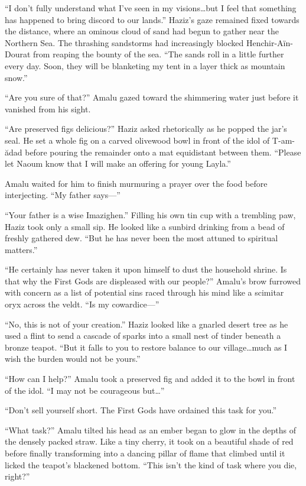 ``I don't fully understand what I've seen in my visions\ldots{}but I feel that something has happened to bring discord to our lands.'' Haziz's gaze remained fixed towards the distance, where an ominous cloud of sand had begun to gather near the Northern Sea. The thrashing sandstorms had increasingly blocked Henchir-Aïn-Dourat from reaping the bounty of the sea. ``The sands roll in a little further every day. Soon, they will be blanketing my tent in a layer thick as mountain snow.''

``Are you sure of that?'' Amalu gazed toward the shimmering water just before it vanished from his sight.

``Are preserved figs delicious?'' Haziz asked rhetorically as he popped the jar's seal. He set a whole fig on a carved olivewood bowl in front of the idol of T-am-ădad before pouring the remainder onto a mat equidistant between them. ``Please let Naoum know that I will make an offering for young Layla.''

Amalu waited for him to finish murmuring a prayer over the food before interjecting. ``My father says---''

``Your father is a wise Imazighen.'' Filling his own tin cup with a trembling paw, Haziz took only a small sip. He looked like a sunbird drinking from a bead of freshly gathered dew. ``But he has never been the most attuned to spiritual matters.''

``He certainly has never taken it upon himself to dust the household shrine. Is that why the First Gods are displeased with our people?'' Amalu's brow furrowed with concern as a list of potential sins raced through his mind like a scimitar oryx across the veldt. ``Is my cowardice---''

``No, this is not of your creation.'' Haziz looked like a gnarled desert tree as he used a flint to send a cascade of sparks into a small nest of tinder beneath a bronze teapot. ``But it falls to you to restore balance to our village\ldots{}much as I wish the burden would not be yours.''

``How can I help?'' Amalu took a preserved fig and added it to the bowl in front of the idol. ``I may not be courageous but\ldots''

``Don't sell yourself short. The First Gods have ordained this task for you.''

``What task?'' Amalu tilted his head as an ember began to glow in the depths of the densely packed straw. Like a tiny cherry, it took on a beautiful shade of red before finally transforming into a dancing pillar of flame that climbed until it licked the teapot's blackened bottom. ``This isn't the kind of task where you die, right?''

